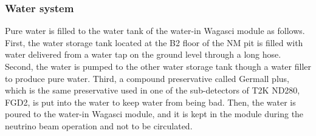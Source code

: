 \subsubsection{Water system}
Pure water is filled to the water tank of the water-in Wagasci module as follows.
First, the water storage tank located at the B2 floor of the NM pit is filled with water delivered from a water tap on the ground level through a long hose. 
Second, the water is pumped to the other water storage tank though a water filler to produce pure water.
Third, a compound preservative called Germall plus, which is the same preservative used in one of the sub-detectors of T2K ND280, FGD2, is put into the water to keep water from being bad.
Then, the water is poured to the water-in Wagasci module, and it is kept in the module during the neutrino beam operation and not to be circulated.

